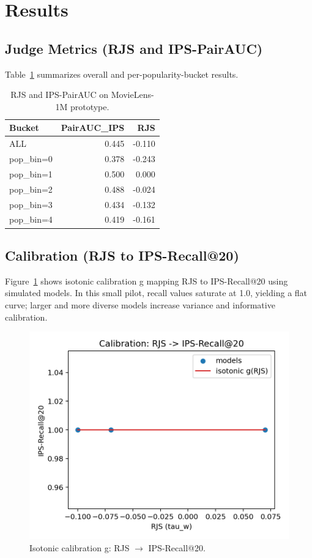 \documentclass[sigconf,anonymous,review]{acmart}
\begin{document}
\section{Results}

\subsection{Judge Metrics (RJS and IPS-PairAUC)}
Table~\ref{tab:rjs} summarizes overall and per-popularity-bucket results.

\begin{table}[h]
\centering
\begin{tabular}{lrr}
\toprule
Bucket & PairAUC\_IPS & RJS\\
\midrule
ALL & 0.445 & -0.110 \\
pop\_bin=0 & 0.378 & -0.243 \\
pop\_bin=1 & 0.500 & 0.000 \\
pop\_bin=2 & 0.488 & -0.024 \\
pop\_bin=3 & 0.434 & -0.132 \\
pop\_bin=4 & 0.419 & -0.161 \\
\bottomrule
\end{tabular}
\caption{RJS and IPS-PairAUC on MovieLens-1M prototype.}
\label{tab:rjs}
\end{table}

\subsection{Calibration (RJS to IPS-Recall@20)}
Figure~\ref{fig:calib} shows isotonic calibration g mapping RJS to IPS-Recall@20 using simulated models. In this small pilot, recall values saturate at 1.0, yielding a flat curve; larger and more diverse models increase variance and informative calibration.

\begin{figure}[h]
\centering
\includegraphics[width=0.7\linewidth]{../reports/figs/calib_isotonic.png}
\caption{Isotonic calibration g: RJS \(\to\) IPS-Recall@20.}
\label{fig:calib}
\end{figure}
\end{document}
